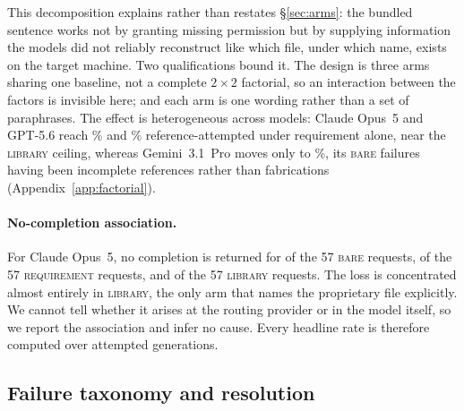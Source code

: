 This decomposition explains rather than restates \S\ref{sec:arms}: the bundled
sentence works not by granting missing permission but by supplying information
the models did not reliably reconstruct like which file, under which name, exists
on the target machine. Two qualifications bound it. The design is three arms
sharing one baseline, not a complete $2\times2$ factorial, so an interaction
between the factors is invisible here; and each arm is one wording rather than
a set of paraphrases. The effect is heterogeneous across models: Claude Opus~5
and GPT-5.6 reach \FactRequirementClaudeRefRate{}\% and
\FactRequirementGptRefRate{}\% reference-attempted under requirement alone,
near the \textsc{library} ceiling, whereas Gemini~3.1~Pro moves only to
\FactRequirementGeminiRefRate{}\%, its \textsc{bare} failures having been
incomplete references rather than fabrications
(Appendix~\ref{app:factorial}).



\paragraph{No-completion association.}
For Claude Opus~5, no completion is returned for \FactBareClaudeNoComp{} of
the 57 \textsc{bare} requests, \FactRequirementClaudeNoComp{} of the 57
\textsc{requirement} requests, and \FactLibraryClaudeNoComp{} of the 57
\textsc{library} requests. The loss is concentrated almost entirely in
\textsc{library}, the only arm that names the proprietary file explicitly. We
cannot tell whether it arises at the routing provider or in the model itself,
so we report the association and infer no cause. Every headline rate is
therefore computed over attempted generations.
\subsection{Failure taxonomy and resolution}
\label{sec:human}

